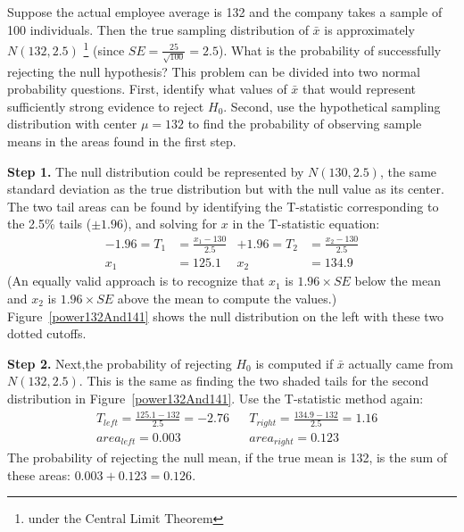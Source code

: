 \begin{example}{Suppose the actual employee average is 132 and the company takes a sample of 100 individuals. Then the true sampling distribution of $\bar{x}$ is approximately $N(132, 2.5)$ \footnote{under the Central Limit Theorem} (since $SE = \frac{25}{\sqrt{100}} = 2.5$). What is the probability of successfully rejecting the null hypothesis?}
\label{computePowerIfMuIs132AndMu0Is130}
This problem can be divided into two normal probability questions. First, identify what values of $\bar{x}$  that would represent sufficiently strong evidence to reject $H_0$. Second, use the hypothetical sampling distribution with center $\mu=132$ to find the probability of observing sample means in the areas found in the first step.

\textbf{Step 1.} The null distribution could be represented by $N(130, 2.5)$, the same standard deviation as the true distribution but with the null value as its center. The two tail areas can be found by identifying the T-statistic corresponding to the 2.5\% tails ($\pm 1.96$), and solving for $x$ in the T-statistic equation:
\begin{align*}
-1.96 = T_1 &= \frac{x_1 - 130}{2.5}
	&+1.96 = T_2 &= \frac{x_2 - 130}{2.5} \\
x_1 &= 125.1
	&x_2 &= 134.9
\end{align*}
(An equally valid approach is to recognize that $x_1$ is $1.96\times SE$ below the mean and $x_2$ is $1.96\times SE$ above the mean to compute the values.) Figure~\ref{power132And141} shows the null distribution on the left with these two dotted cutoffs.

\textbf{Step 2.} Next,the probability of rejecting $H_0$ is computed if $\bar{x}$ actually came from $N(132, 2.5)$. This is the same as finding the two shaded tails for the second distribution in Figure~\ref{power132And141}. Use the T-statistic method again:
\begin{align*}
&T_{left} = \frac{125.1 - 132}{2.5} = -2.76
	&&T_{right} = \frac{134.9 - 132}{2.5} = 1.16 \\
&area_{left} =0.003
	&&area_{right} =0.123
\end{align*}
The probability of rejecting the null mean, if the true mean is 132, is the sum of these areas: $0.003 + 0.123 = 0.126$.
\end{example}

